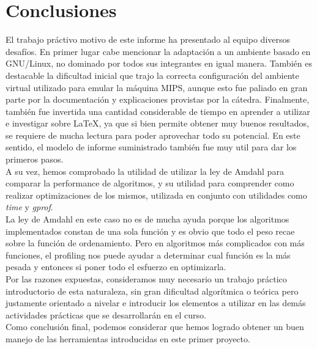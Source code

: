 \documentclass[a4paper,10pt]{article}
\begin{document}
\section{Conclusiones}
El trabajo pr\'activo motivo de este informe ha presentado al equipo diversos desaf\'ios. En primer lugar cabe mencionar la adaptaci\'on a un ambiente basado en GNU/Linux, no dominado por todos sus integrantes en igual manera. Tambi\'en es destacable la dificultad inicial que trajo la correcta configuraci\'on del ambiente virtual utilizado para emular la m\'aquina MIPS, aunque esto fue paliado en gran parte por la documentaci\'on y explicaciones provistas por la c\'atedra. Finalmente, tambi\'en fue invertida una cantidad considerable de tiempo en aprender a utilizar e investigar sobre \LaTeX{}, ya que si bien permite obtener muy buenos resultados, se requiere de mucha lectura para poder aprovechar todo su potencial. En este sentido, el modelo de informe suministrado tambi\'en fue muy util para dar los primeros pasos.\\
A su vez, hemos comprobado la utilidad de utilizar la ley de Amdahl para comparar la performance de algoritmos, y su utilidad para comprender como realizar optimizaciones de los mismos, utilizada en conjunto con utilidades como \textit{time} y \textit{gprof}.\\
La ley de Amdahl en este caso no es de mucha ayuda porque los algoritmos implementados constan de una sola funci\'on y es obvio que todo el peso recae sobre la funci\'on de ordenamiento. Pero en algoritmos m\'as complicados con m\'as funciones, el profiling nos puede ayudar a determinar cual funci\'on es la m\'as pesada y entonces si poner todo el esfuerzo en optimizarla.\\
Por las razones expuestas, consideramos muy necesario un trabajo pr\'actico introductorio de esta naturaleza, sin gran dificultad algor\'itmica o te\'orica pero justamente orientado a nivelar e introducir los elementos a utilizar en las dem\'as actividades pr\'acticas que se desarrollar\'an en el curso.\\
Como conclusi\'on final, podemos considerar que hemos logrado obtener un buen manejo de las herramientas introducidas en este primer proyecto.

\pagebreak
\end{document}
